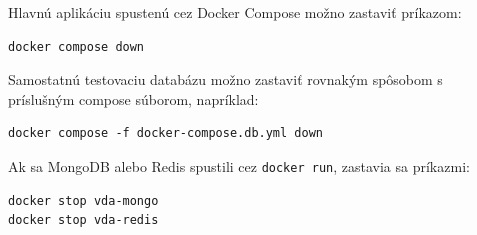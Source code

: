 \documentclass[a4paper, 12pt]{article}
\begin{document}
Hlavnú aplikáciu spustenú cez Docker Compose možno zastaviť príkazom:

\begin{lstlisting}
docker compose down
\end{lstlisting}

Samostatnú testovaciu databázu možno zastaviť rovnakým spôsobom s príslušným compose súborom, napríklad:

\begin{lstlisting}
docker compose -f docker-compose.db.yml down
\end{lstlisting}

Ak sa MongoDB alebo Redis spustili cez \texttt{docker run}, zastavia sa príkazmi:

\begin{lstlisting}
docker stop vda-mongo
docker stop vda-redis
\end{lstlisting}
\end{document}
